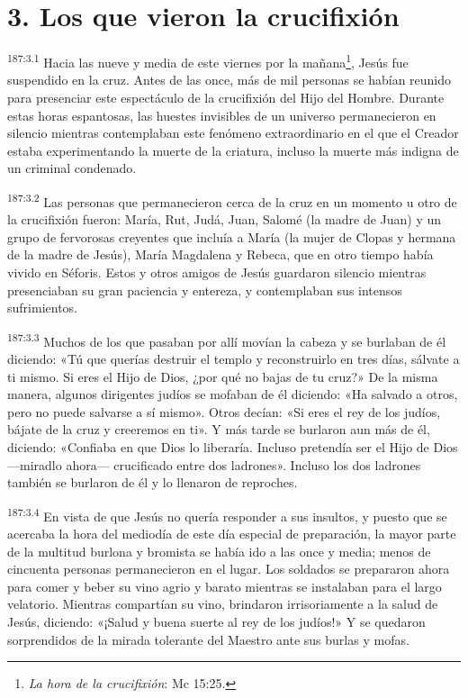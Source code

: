 \section*{3. Los que vieron la crucifixión}
\par 
\textsuperscript{187:3.1} Hacia las nueve y media de este viernes por la mañana\footnote{\textit{La hora de la crucifixión}: Mc 15:25.}, Jesús fue suspendido en la cruz. Antes de las once, más de mil personas se habían reunido para presenciar este espectáculo de la crucifixión del Hijo del Hombre. Durante estas horas espantosas, las huestes invisibles de un universo permanecieron en silencio mientras contemplaban este fenómeno extraordinario en el que el Creador estaba experimentando la muerte de la criatura, incluso la muerte más indigna de un criminal condenado.

\par 
\textsuperscript{187:3.2} Las personas que permanecieron cerca de la cruz en un momento u otro de la crucifixión fueron: María, Rut, Judá, Juan, Salomé (la madre de Juan) y un grupo de fervorosas creyentes que incluía a María (la mujer de Clopas y hermana de la madre de Jesús), María Magdalena y Rebeca, que en otro tiempo había vivido en Séforis. Estos y otros amigos de Jesús guardaron silencio mientras presenciaban su gran paciencia y entereza, y contemplaban sus intensos sufrimientos.

\par 
\textsuperscript{187:3.3} Muchos de los que pasaban por allí movían la cabeza y se burlaban de él diciendo: «Tú que querías destruir el templo y reconstruirlo en tres días, sálvate a ti mismo. Si eres el Hijo de Dios, ¿por qué no bajas de tu cruz?» De la misma manera, algunos dirigentes judíos se mofaban de él diciendo: «Ha salvado a otros, pero no puede salvarse a sí mismo». Otros decían: «Si eres el rey de los judíos, bájate de la cruz y creeremos en ti». Y más tarde se burlaron aun más de él, diciendo: «Confiaba en que Dios lo liberaría. Incluso pretendía ser el Hijo de Dios ---miradlo ahora--- crucificado entre dos ladrones». Incluso los dos ladrones también se burlaron de él y lo llenaron de reproches.

\par 
\textsuperscript{187:3.4} En vista de que Jesús no quería responder a sus insultos, y puesto que se acercaba la hora del mediodía de este día especial de preparación, la mayor parte de la multitud burlona y bromista se había ido a las once y media; menos de cincuenta personas permanecieron en el lugar. Los soldados se prepararon ahora para comer y beber su vino agrio y barato mientras se instalaban para el largo velatorio. Mientras compartían su vino, brindaron irrisoriamente a la salud de Jesús, diciendo: «¡Salud y buena suerte al rey de los judíos!» Y se quedaron sorprendidos de la mirada tolerante del Maestro ante sus burlas y mofas.

